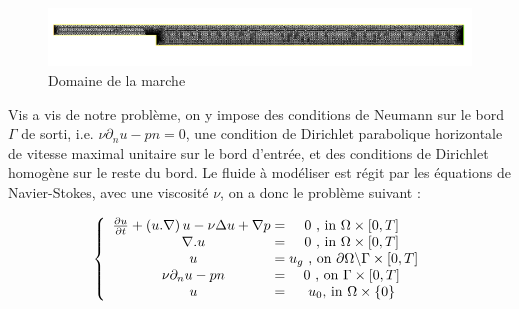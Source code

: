 \documentclass[a4paper,12pt]{article}
\begin{document}
\begin{figure}[h!]                                                                                                                                                                                 
\begin{center}                                                                                                                                                                                               
        \includegraphics[scale = 0.2]{image/marche.png}                                                                                                                                              
\end{center}                                                                                                                                                                                                 
\caption{Domaine de la marche}                                                                                                                                        
\end{figure}

Vis a vis de notre problème, on y impose des conditions de Neumann sur le bord $\Gamma$ de sorti, i.e. $\nu \partial_n u - pn = 0$, une condition de Dirichlet parabolique horizontale de vitesse maximal unitaire sur le bord d'entrée, et des conditions de Dirichlet homogène sur le reste du bord. Le fluide à modéliser est régit par les équations de Navier-Stokes, avec une viscosité $\nu$, on a donc le problème suivant :

\begin{equation}
\left \{
\begin{array}{c @{ = } c}
 \frac{\partial u}{\partial t}  + \left( u.\nabla \right) u   -\nu \Delta u + \nabla p \; & 0 \text{ , in } \Omega \times [0,T] \\
\nabla . u  & 0 \text{ , in } \Omega \times [0,T] \\
u & \; u_g \text{ , on } \partial\Omega \backslash \Gamma \times [0,T] \\
\nu\partial_{n}u - pn & 0 \text{ , on } \Gamma \times [0,T] \\
u & u_0 \text{, in } \Omega \times \{0\} \\
\end{array}
\right.
\end{equation}
\end{document}
